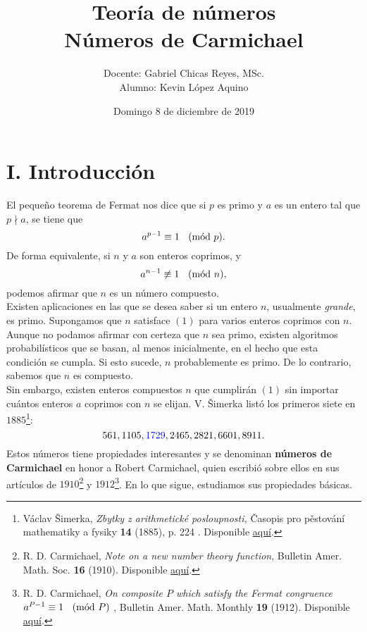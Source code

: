 \documentclass{article}
\theoremstyle{definition}
\newcommand{\Mod}[1]{\ \hspace{0.2cm} (\mathrm{m\acute{o}d}\ #1)}
\begin{document}
\date{Domingo 8 de diciembre de 2019}
\title{ \textbf{Teoría de números}  \\
 Números de Carmichael}
\author{Docente: Gabriel Chicas Reyes, MSc.\\ 
				Alumno: Kevin López Aquino }

\maketitle 
\vspace{0.3cm}
\section*{I. Introducción}
\vspace{0.5cm}
El pequeño teorema de Fermat nos dice que si $p$ es primo y $a$ es un entero tal que $p \nmid a$, se tiene que 
\begin{equation}
a^{p-1} \equiv 1 \Mod{p}. 
\end{equation} 
De forma equivalente, si $n$ y $a$ son enteros coprimos, y
$$ a^{n - 1} \not \equiv 1 \Mod{n}, $$
podemos afirmar que $n$ es un número compuesto. \\

Existen aplicaciones en las que se desea saber si un entero $n$, usualmente \textit{grande}, es primo. Supongamos que $n$ satisface $(1)$ para varios enteros coprimos con $n$. Aunque no podamos afirmar con certeza que $n$ sea primo, existen algoritmos probabilísticos que se basan, al menos inicialmente, en el hecho que esta condición se cumpla. Si esto sucede, $n$ probablemente es primo. De lo contrario, sabemos que $n$ es compuesto. \\

Sin embargo, existen enteros compuestos $n$ que cumplirán $(1)$ sin importar cuántos enteros $a$ coprimos con $n$ se elijan.  V. Šimerka listó los primeros siete en $1885$\footnote{Václav Šimerka, \textit{Zbytky z arithmetické posloupnosti,} Časopis pro pěstování mathematiky a fysiky  \textbf{14} (1885), p. 224 . Disponible \href{https://gdz.sub.uni-goettingen.de/id/PPN31311028X_0014}{aquí}. }:
$$561, 1105, \textcolor{blue}{1729}, 2465, 2821, 6601, 8911.$$Estos números tiene propiedades interesantes y se denominan \textbf{números de Carmichael} en honor a Robert Carmichael, quien escribió sobre ellos en sus artículos de $1910$\footnote{R. D. Carmichael, \textit{Note on a new number theory function}, Bulletin Amer. Math. Soc. \textbf{16} (1910). Disponible \href{https://pdfs.semanticscholar.org/1265/8f32cfd22044bb64c9b32f33fe16b4790384.pdf}{aquí}.} y $1912$\footnote{R. D. Carmichael, \textit{On composite $P$ which  satisfy the Fermat congruence $a^{P-1} \equiv 1 \Mod{P}$ }, Bulletin Amer. Math. Monthly \textbf{19} (1912). Disponible \href{https://www.jstor.org/stable/2972687?seq=3\#metadata_info_tab_contents}{aquí}.}. 
En lo que sigue, estudiamos sus propiedades básicas. 
\newpage
\end{document}
